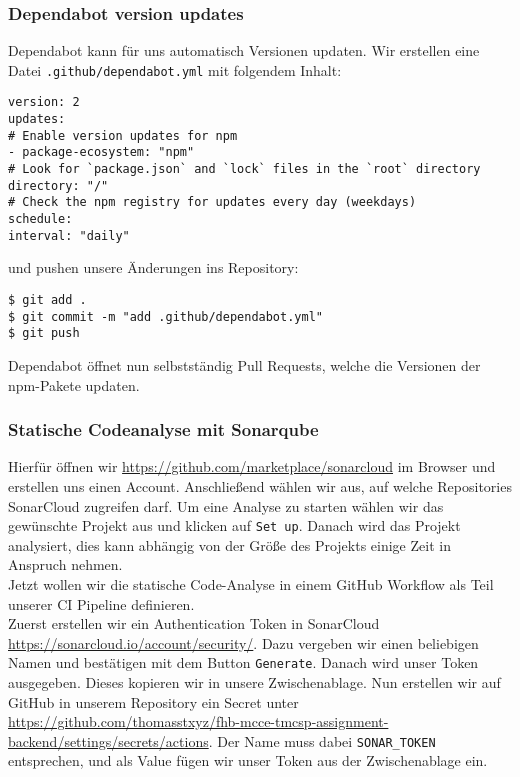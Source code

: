 \subsubsection{Dependabot version updates}
Dependabot kann für uns automatisch Versionen updaten.
Wir erstellen eine Datei \verb|.github/dependabot.yml| 
mit folgendem Inhalt:

\begin{verbatim}
version: 2
updates:
# Enable version updates for npm
- package-ecosystem: "npm"
# Look for `package.json` and `lock` files in the `root` directory
directory: "/"
# Check the npm registry for updates every day (weekdays)
schedule:
interval: "daily"
\end{verbatim}

\noindent
und pushen unsere Änderungen ins Repository:

\begin{verbatim}
$ git add .
$ git commit -m "add .github/dependabot.yml"
$ git push
\end{verbatim}

\noindent
Dependabot öffnet nun selbstständig Pull Requests,
welche die Versionen der npm-Pakete updaten.

\subsubsection{Statische Codeanalyse mit Sonarqube}
Hierfür öffnen wir \url{https://github.com/marketplace/sonarcloud}
im Browser und erstellen uns einen Account.
Anschließend wählen wir aus, auf welche Repositories
SonarCloud zugreifen darf.
Um eine Analyse zu starten wählen wir das gewünschte Projekt aus 
und klicken auf \verb|Set up|.
Danach wird das Projekt analysiert, dies kann abhängig von der Größe des Projekts einige Zeit in
Anspruch nehmen. \\

\noindent
Jetzt wollen wir die statische Code-Analyse in einem
GitHub Workflow als Teil unserer CI Pipeline definieren. \\

\noindent
Zuerst erstellen wir ein Authentication Token in 
SonarCloud \url{https://sonarcloud.io/account/security/}.
Dazu vergeben wir einen beliebigen Namen und bestätigen mit 
dem Button \verb|Generate|.
Danach wird unser Token ausgegeben. 
Dieses kopieren wir in unsere Zwischenablage.
Nun erstellen wir auf GitHub in unserem Repository
ein Secret unter \url{https://github.com/thomasstxyz/fhb-mcce-tmcsp-assignment-backend/settings/secrets/actions}.
Der Name muss dabei \verb|SONAR_TOKEN| entsprechen,
und als Value fügen wir unser Token aus der Zwischenablage ein. \\

